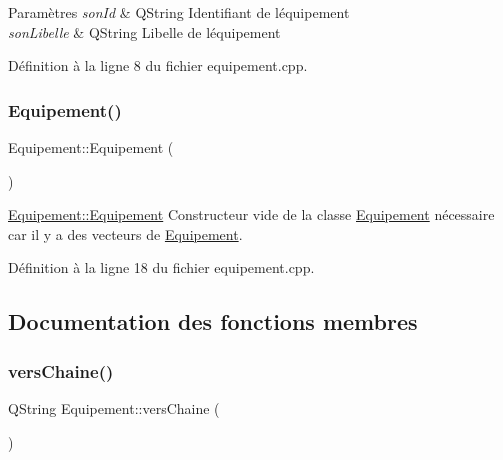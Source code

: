 \begin{DoxyParams}{Paramètres}
{\em son\+Id} & Q\+String Identifiant de l\textquotesingle{}équipement \\
\hline
{\em son\+Libelle} & Q\+String Libelle de l\textquotesingle{}équipement \\
\hline
\end{DoxyParams}


Définition à la ligne 8 du fichier equipement.\+cpp.

\mbox{\label{class_equipement_a9057a4777d006cbac4c72d09a8d09407}} 
\subsubsection{\texorpdfstring{Equipement()}{Equipement()}\hspace{0.1cm}{\footnotesize\ttfamily [2/2]}}
{\footnotesize\ttfamily Equipement\+::\+Equipement (\begin{DoxyParamCaption}{ }\end{DoxyParamCaption})}



\hyperlink{class_equipement_a7017dfb537dadbaddac0d8006d96500b}{Equipement\+::\+Equipement} Constructeur vide de la classe \hyperlink{class_equipement}{Equipement} nécessaire car il y a des vecteurs de \hyperlink{class_equipement}{Equipement}. 



Définition à la ligne 18 du fichier equipement.\+cpp.



\subsection{Documentation des fonctions membres}
\mbox{\label{class_equipement_a5e45c0b5524b353c77a23b618d73a1d0}} 
\subsubsection{\texorpdfstring{vers\+Chaine()}{versChaine()}}
{\footnotesize\ttfamily Q\+String Equipement\+::vers\+Chaine (\begin{DoxyParamCaption}{ }\end{DoxyParamCaption})}



